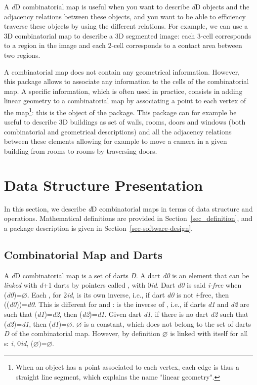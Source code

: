 A \emph{d}D combinatorial map is useful when you want to describe \emph{d}D
objects and the adjacency relations between these objects, and you
want to be able to efficiency traverse these objects by using the
different relations.  For example, we can use a 3D combinatorial map
to describe a 3D segmented image: each 3-cell corresponds to a region
in the image and each 2-cell corresponds to a contact area between two
regions.

A combinatorial map does not contain any geometrical
information. However, this package allows to associate any information
to the cells of the combinatorial map. A specific information, which
is often used in practice, consists in adding linear geometry to a
combinatorial map by associating a point to each vertex of the
map\footnote{When an object has a point associated to each vertex,
  each edge is thus a straight line segment, which explains the name
  "linear geometry".}: this is the object of the
 package. This package can for example be
useful to describe 3D buildings as set of walls, rooms, doors and
windows (both combinatorial and geometrical descriptions) and all the
adjacency relations between these elements allowing for example to
move a camera in a given building from rooms to rooms by traversing
doors.

\section{Data Structure Presentation}\label{sec_presentation}

In this section, we describe \emph{d}D combinatorial maps in terms of data
structure and operations. Mathematical definitions are provided in
Section~\ref{sec_definition}, and a package description is given in
Section~\ref{sec-software-design}.

\subsection{Combinatorial Map and Darts}\label{ssec-combi-map-and-darts}

A \emph{d}D combinatorial map is a set of darts \emph{D}. A dart \emph{d0} is an
element that can be \emph{linked} with \emph{d}+1 darts by pointers called
\betai{}, with 0\myleq{}\emph{i}\myleq{}\emph{d}.  Dart \emph{d0} is said \emph{i-free}
when \betai{}(\emph{d0})=$\varnothing$.  Each \betai{}, for 2\myleq{}\emph{i}\myleq{}\emph{d},
is its own inverse, i.e., if dart \emph{d0} is not \emph{i}-free, then
\betai{}(\betai{}(\emph{d0}))=\emph{d0}.  This is different for \betazero{} and
\betaun{}: \betazero{} is the inverse of \betaun{}, i.e., if darts \emph{d1}
and \emph{d2} are such that \betaun{}(\emph{d1})=\emph{d2}, then
\betazero{}(\emph{d2})=\emph{d1}. Given dart \emph{d1}, if there is no dart \emph{d2} such
that \betaun{}(\emph{d2})=\emph{d1}, then \betazero{}(\emph{d1})=$\varnothing$.  $\varnothing$
is a constant, which does not belong to the set of darts \emph{D} of the
combinatorial map. However, by definition $\varnothing$ is linked with
itself for all \betai{}s: \myforall{}\emph{i}, 0\myleq{}\emph{i}\myleq{}\emph{d},
\betai{}($\varnothing)$=$\varnothing$.

